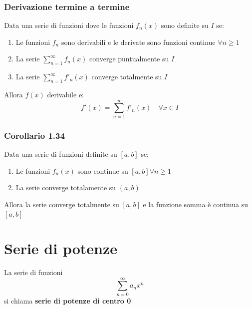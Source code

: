 \documentclass[10pt, a4paper]{article}
\begin{document}
        \subsubsection{Derivazione termine a termine}
            Data una serie di funzioni dove le funzioni $f_n(x)$ sono definite su $I$ se:
            \begin{enumerate}
                \item Le funzioni $f_n$ sono derivabili e le derivate sono funzioni continue $\forall n\geq 1$
                \item La serie $\sum_{n=1}^{\infty}f_n(x)$ converge puntualmente su $I$
                \item La serie $\sum_{n=1}^{\infty}f'_n(x)$ converge totalmente su $I$
            \end{enumerate}
            Allora $f(x)$ derivabile e:
            \begin{equation*}
                f'(x) = \sum_{n=1}^{\infty}f'_n(x) \quad \forall x\in I
            \end{equation*}
        \subsubsection{Corollario 1.34}
            Data una serie di funzioni definite su $[a,b]$ se:
            \begin{enumerate}
                \item Le funzioni $f_n(x)$ sono continue su $[a,b]\forall n\geq 1$
                \item La serie converge totalamente su $(a,b)$
            \end{enumerate}
            Allora la serie converge totalmente su $[a,b]$ e la funzione somma è continua su $[a,b]$
\section{Serie di potenze}
    La serie di funzioni
    \begin{equation*}
        \sum_{n=0}^{\infty}a_n x^n
    \end{equation*}            
    si chiama \textbf{serie di potenze di centro 0}
\end{document}
